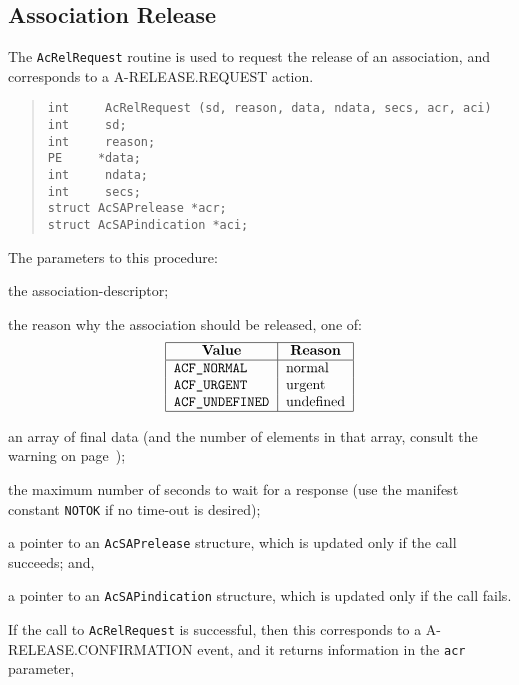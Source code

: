\subsection	{Association Release}
The \verb"AcRelRequest" routine is used to request the release of an
association,
and corresponds to a {\sf A-RELEASE.REQUEST\/} action.
\begin{quote}\small\begin{verbatim}
int     AcRelRequest (sd, reason, data, ndata, secs, acr, aci)
int     sd;
int     reason;
PE     *data;
int     ndata;
int     secs;
struct AcSAPrelease *acr;
struct AcSAPindication *aci;
\end{verbatim}\end{quote}
The parameters to this procedure:
\begin{describe}
\item[\verb"sd":] the association-descriptor;

\item[\verb"reason":] the reason why the association should be released,
one of:
\[\begin{tabular}{|l|l|}
\hline
    \multicolumn{1}{|c|}{\bf Value}&
		\multicolumn{1}{c|}{\bf Reason}\\
\hline
    \tt ACF\_NORMAL&	normal\\
    \tt ACF\_URGENT&	urgent\\
    \tt ACF\_UNDEFINED&	undefined\\
\hline
\end{tabular}\]

\item[\verb"data"/\verb"ndata":] an array of final data
(and the number of elements in that array,
consult the warning on page~\pageref{AcSAPdata});

\item[\verb"secs":] the maximum number of seconds to wait for a response
(use the manifest constant \verb"NOTOK" if no time-out is desired);

\item[\verb"acr":] a pointer to an \verb"AcSAPrelease" structure,
which is updated only if the call succeeds;
and,

\item[\verb"aci":] a pointer to an \verb"AcSAPindication" structure,
which is updated only if the call fails.
\end{describe}
If the call to \verb"AcRelRequest" is successful,
then this corresponds to a {\sf A-RELEASE.CONFIRMATION\/} event,
and it returns information in the \verb"acr" parameter,
